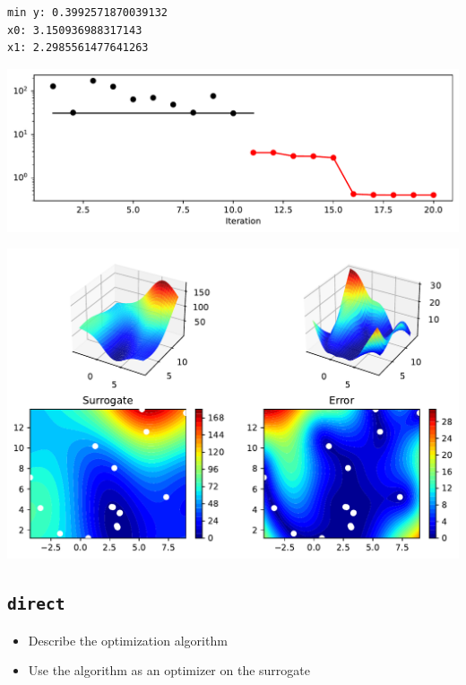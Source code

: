 \documentclass[
  letterpaper,
  DIV=11,
  numbers=noendperiod]{scrreprt}
\providecommand{\tightlist}{%
  \setlength{\itemsep}{0pt}\setlength{\parskip}{0pt}}\usepackage{longtable,booktabs,array}
\begin{document}
\begin{tcolorbox}
\begin{verbatim}
min y: 0.3992571870039132
x0: 3.150936988317143
x1: 2.2985561477641263
\end{verbatim}

\includegraphics{004_spot_sklearn_optimization_files/figure-pdf/cell-9-output-2.pdf}

\includegraphics{004_spot_sklearn_optimization_files/figure-pdf/cell-9-output-3.pdf}

\end{tcolorbox}

\subsection{\texorpdfstring{\texttt{direct}}{direct}}\label{direct-1}

\begin{itemize}
\tightlist
\item
  Describe the optimization algorithm
\item
  Use the algorithm as an optimizer on the surrogate
\end{itemize}
\end{document}

